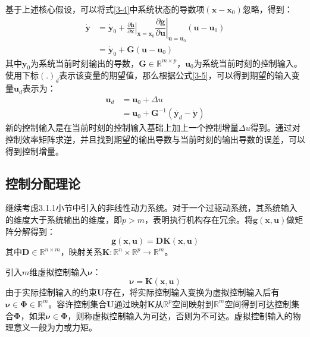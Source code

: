 基于上述核心假设，可以将式\eqref{3-4}中系统状态的导数项$(\boldsymbol{x}-\boldsymbol{x}_0)$忽略，得到：
\begin{equation}
    \begin{aligned}
    \dot{\boldsymbol{y}} &= \dot{\boldsymbol{y}}_0 +  \left.\frac{\partial \boldsymbol{h}}{\partial \boldsymbol{x}}\right|_{\boldsymbol{x}=\boldsymbol{x}_0}\left.\dfrac{\partial \boldsymbol{g}}{\partial \boldsymbol{u}}\right|_{\boldsymbol{u}=\boldsymbol{u}_0}(\boldsymbol{u}-\boldsymbol{u}_0)\\
        &= \dot{\boldsymbol{y}}_0 + \boldsymbol{G}(\boldsymbol{u}-\boldsymbol{u}_0)
    \end{aligned}
    \label{3-5}
\end{equation}
其中$\dot{\boldsymbol{y}}_0$为系统当前时刻输出的导数，$\boldsymbol{G}\in\mathbb{R}^{m\times p}$，$\boldsymbol{u}_0$为系统当前时刻的控制输入。
使用下标$(.)_{d}$表示该变量的期望值，那么根据公式\eqref{3-5}，可以得到期望的输入变量$\boldsymbol{u}_{d}$表示为：
\begin{equation}
    \begin{aligned}
    \boldsymbol{u}_{d}&=\boldsymbol{u}_{0}+\Delta u\\
    &=\boldsymbol{u}_{0}+\boldsymbol{G}^{-1}(\dot{\boldsymbol{y}_d}-\dot{\boldsymbol{y}})
    \label{3-6}
    \end{aligned}
\end{equation}
新的控制输入是在当前时刻的控制输入基础上加上一个控制增量$\Delta u$得到。通过对控制效率矩阵求逆，并且找到期望的输出导数与当前时刻的输出导数的误差，可以得到控制增量。

\subsection{控制分配理论}

继续考虑3.1.1小节中引入的非线性动力系统。对于一个过驱动系统，其系统输入的维度大于系统输出的维度，即$p>m$，表明执行机构存在冗余。将$\boldsymbol{g}(\boldsymbol{x},\boldsymbol{u})$做矩阵分解得到：
\begin{equation}
    \boldsymbol{g}(\boldsymbol{x},\boldsymbol{u})=\boldsymbol{D}\boldsymbol{K}(\boldsymbol{x},\boldsymbol{u})
    \label{3-7}
\end{equation}
其中$\boldsymbol{D}\in\mathbb{R}^{n\times m}$，映射关系$\boldsymbol{K}:\mathbb{R}^n\times\mathbb{R}^p\rightarrow\mathbb{R}^m$。

引入$m$维虚拟控制输入$\boldsymbol{\nu}$：
\begin{equation}
    \boldsymbol{\nu}=\boldsymbol{K}(\boldsymbol{x},\boldsymbol{u})
    \label{3-8}
\end{equation}
由于实际控制输入的约束$\boldsymbol{U}$存在，将实际控制输入变换为虚拟控制输入后有$\boldsymbol{\nu}\in\boldsymbol{\Phi}\in\mathbb{R}^{m}$。容许控制集合$\boldsymbol{U}$通过映射$\boldsymbol{K}$从$\mathbb{R}^{p}$空间映射到$\mathbb{R}^{m}$空间得到可达控制集合$\boldsymbol{\Phi}$，如果$\boldsymbol{\nu}\in\boldsymbol{\Phi}$，则称虚拟控制输入为可达，否则为不可达。虚拟控制输入的物理意义一般为力或力矩。

